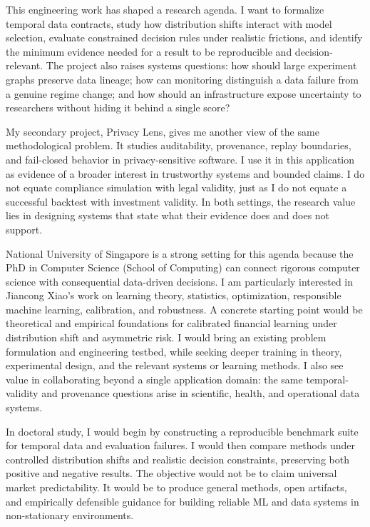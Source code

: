 \documentclass[11pt]{article}
\begin{document}
This engineering work has shaped a research agenda. I want to formalize temporal data contracts, study how distribution shifts interact with model selection, evaluate constrained decision rules under realistic frictions, and identify the minimum evidence needed for a result to be reproducible and decision-relevant. The project also raises systems questions: how should large experiment graphs preserve data lineage; how can monitoring distinguish a data failure from a genuine regime change; and how should an infrastructure expose uncertainty to researchers without hiding it behind a single score?

My secondary project, Privacy Lens, gives me another view of the same methodological problem. It studies auditability, provenance, replay boundaries, and fail-closed behavior in privacy-sensitive software. I use it in this application as evidence of a broader interest in trustworthy systems and bounded claims. I do not equate compliance simulation with legal validity, just as I do not equate a successful backtest with investment validity. In both settings, the research value lies in designing systems that state what their evidence does and does not support.

National University of Singapore is a strong setting for this agenda because the PhD in Computer Science (School of Computing) can connect rigorous computer science with consequential data-driven decisions. I am particularly interested in Jiancong Xiao's work on learning theory, statistics, optimization, responsible machine learning, calibration, and robustness. A concrete starting point would be theoretical and empirical foundations for calibrated financial learning under distribution shift and asymmetric risk. I would bring an existing problem formulation and engineering testbed, while seeking deeper training in theory, experimental design, and the relevant systems or learning methods. I also see value in collaborating beyond a single application domain: the same temporal-validity and provenance questions arise in scientific, health, and operational data systems.

In doctoral study, I would begin by constructing a reproducible benchmark suite for temporal data and evaluation failures. I would then compare methods under controlled distribution shifts and realistic decision constraints, preserving both positive and negative results. The objective would not be to claim universal market predictability. It would be to produce general methods, open artifacts, and empirically defensible guidance for building reliable ML and data systems in non-stationary environments.
\end{document}
